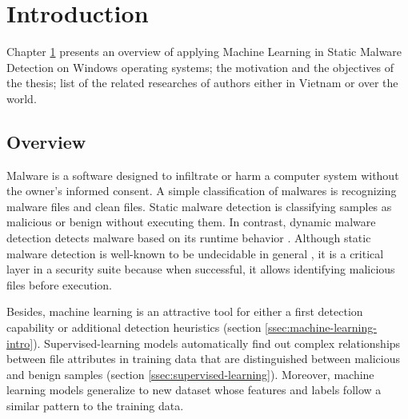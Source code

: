 
\chapter{Introduction}
\label{chap:introduction}
\graphicspath{{Chapter2/Figs/}}

\begin{chapabstract}
Chapter \ref{chap:introduction} presents an overview of applying Machine Learning in Static Malware Detection on Windows operating systems; the motivation and the objectives of the thesis; list of the related researches of authors either in Vietnam or over the world.
\end{chapabstract}

\section{Overview}
\label{sec:overview}

Malware is a software designed to infiltrate or harm a computer system without the owner's informed consent. 
A simple classification of malwares is recognizing malware files and clean files. 
Static malware detection is classifying samples as malicious or benign without executing them. 
In contrast, dynamic malware detection detects malware based on its runtime behavior \cite{athiwaratkun2017malware, dahl2013large}. 
Although static malware detection is well-known to be undecidable in general \cite{cohen1987computer}, it is a critical layer in a security suite because when successful, it allows identifying malicious files before execution.

Besides, machine learning is an attractive tool for either a first detection capability or additional detection heuristics (section \ref{ssec:machine-learning-intro}).
Supervised-learning models automatically find out complex relationships between file attributes in training data that are distinguished between malicious and benign samples (section \ref{ssec:supervised-learning}).
Moreover, machine learning models generalize to new dataset whose features and labels follow a similar pattern to the training data. 


